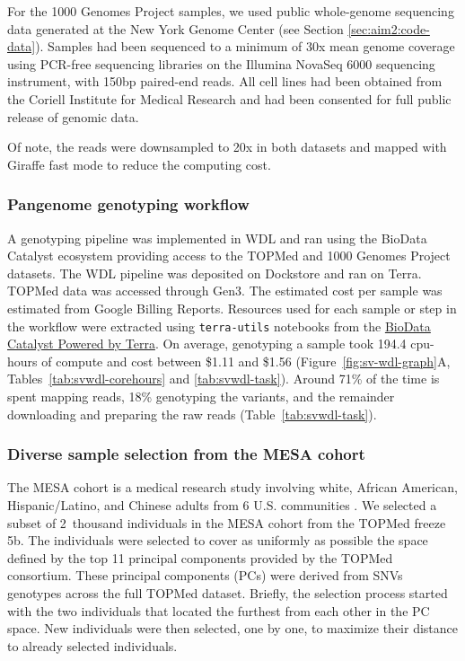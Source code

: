 \documentclass[11pt]{ucscthesis}
\begin{document}
For the 1000 Genomes Project samples, we used public whole-genome sequencing data generated at the New York Genome Center\cite{1000gp_nygc_2021} (see Section \ref{sec:aim2:code-data}).
Samples had been sequenced to a minimum of 30x mean genome coverage using PCR-free sequencing libraries on the Illumina NovaSeq 6000 sequencing instrument, with 150bp paired-end reads.
All cell lines had been obtained from the Coriell Institute for Medical Research and had been consented for full public release of genomic data.

Of note, the reads were downsampled to 20x in both datasets and mapped with Giraffe fast mode to reduce the computing cost.


\subsubsection{Pangenome genotyping workflow}

A genotyping pipeline was implemented in WDL and ran using the BioData Catalyst ecosystem\cite{bdc2020} providing access to the TOPMed and 1000 Genomes Project datasets.
The WDL pipeline was deposited on Dockstore\cite{vgsv_dockstore} and ran on Terra.
TOPMed data was accessed through Gen3.
The estimated cost per sample was estimated from Google Billing Reports.
Resources used for each sample or step in the workflow were extracted using \texttt{terra-utils} notebooks from the \href{https://biodatacatalyst.nhlbi.nih.gov/platforms/terra}{BioData Catalyst Powered by Terra}.
On average, genotyping a sample took 194.4 cpu-hours of compute and cost between \$1.11 and \$1.56 (Figure~\ref{fig:sv-wdl-graph}A, Tables~\ref{tab:svwdl-corehours} and \ref{tab:svwdl-task}).
Around 71\% of the time is spent mapping reads, 18\% genotyping the variants, and the remainder downloading and preparing the raw reads (Table~\ref{tab:svwdl-task}).



\subsubsection{Diverse sample selection from the MESA cohort}
\label{subsec:aim2:mesaselection}

The MESA cohort is a medical research study involving white, African American, Hispanic/Latino, and Chinese adults from 6 U.S. communities \cite{bild2002multi}.
We selected a subset of 2~thousand individuals in the MESA cohort from the TOPMed freeze 5b.
The individuals were selected to cover as uniformly as possible the space defined by the top 11 principal components provided by the TOPMed consortium.
These principal components (PCs) were derived from SNVs genotypes across the full TOPMed dataset.
Briefly, the selection process started with the two individuals that located the furthest from each other in the PC space.
New individuals were then selected, one by one, to maximize their distance to already selected individuals.
\end{document}

